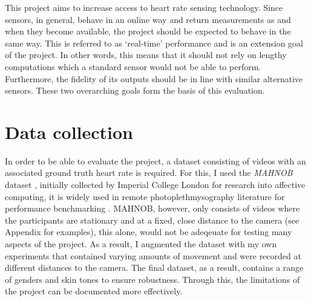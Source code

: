 This project aims to increase access to heart rate sensing technology.
Since sensors, in general, behave in an online way and return measurements as and when they become available, the project should be expected to behave in the same way.
This is referred to as `real-time' performance and is an extension goal of the project.
In other words, this means that it should not rely on lengthy computations which a standard sensor would not be able to perform. 
Furthermore, the fidelity of its outputs should be in line with similar alternative sensors.
These two overarching goals form the basis of this evaluation.

\section{Data collection}
In order to be able to evaluate the project, a dataset consisting of videos with an associated ground truth heart rate is required.
For this, I used the \textit{MAHNOB} dataset \cite{Mahnob}, initially collected by Imperial College London for research into affective computing, it is widely used in remote photoplethmysography literature for performance benchmarking \cite{novel}\cite{mahnob-example}\cite{mahnob-example-2}.
MAHNOB, however, only consists of videos where the participants are stationary and at a fixed, close distance to the camera (see Appendix for examples), this alone, would not be adeqeuate for testing many aspects of the project.
As a result, I augmented the dataset with my own experiments that contained varying amounts of movement and were recorded at different distances to the camera. 
The final dataset, as a result, contains a range of genders and skin tones to ensure robustness.
Through this, the limitations of the project can be documented more effectively.

